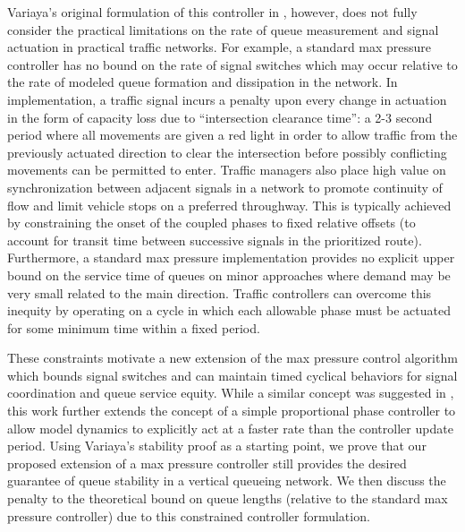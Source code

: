 Variaya's original formulation of this controller in \cite{MaxPressureStochastic}, however, does not fully consider the practical limitations on the rate of queue measurement and signal actuation in practical traffic networks. For example, a standard max pressure controller has no bound on the rate of signal switches which may occur relative to the rate of modeled queue formation and dissipation in the network. In implementation, a traffic signal incurs a penalty upon every change in actuation in the form of capacity loss due to ``intersection clearance time'': a 2-3 second period where all movements are given a red light in order to allow traffic from the previously actuated direction to clear the intersection before possibly conflicting movements can be permitted to enter. Traffic managers also place high value on synchronization between adjacent signals in a network to promote continuity of flow and limit vehicle stops on a preferred throughway. This is typically achieved by constraining the onset of the coupled phases to fixed relative offsets (to account for transit time between successive signals in the prioritized route). Furthermore, a standard max pressure implementation provides no explicit upper bound on the service time of queues on minor approaches where demand may be very small related to the main direction. Traffic controllers can overcome this inequity by operating on a cycle in which each allowable phase must be actuated for some minimum time within a fixed period.

These constraints motivate a new extension of the max pressure control algorithm which bounds signal switches and can maintain timed cyclical behaviors for signal coordination and queue service equity. While a similar concept was suggested in \cite{MaxPressureStochastic}, this work further extends the concept of a simple proportional phase controller to allow model dynamics to explicitly act at a faster rate than the controller update period. Using Variaya's stability proof as a starting point, we prove that our proposed extension of a max pressure controller still provides the desired guarantee of queue stability in a vertical queueing network. We then discuss the penalty to the theoretical bound on queue lengths (relative to the standard max pressure controller) due to this constrained controller formulation. 

